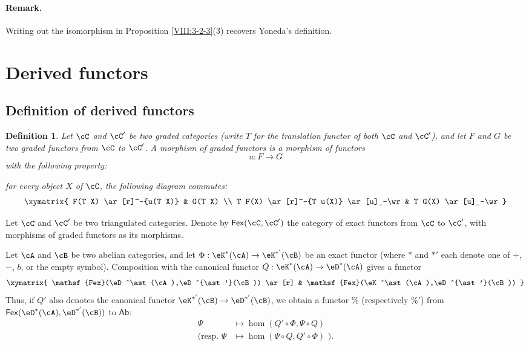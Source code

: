 \documentclass[12pt,oneside,english]{smfbook}
\newtheorem{definition}[subsubsection]{Definition}
\begin{document}
\paragraph{Remark.}
Writing out the isomorphism in Proposition \ref{VIII:3-2-3}(3) recovers Yoneda's definition.

\section{Derived functors}\label{VIII:4}

\subsection{Definition of derived functors}\label{VIII:4-1}

\begin{definition}\label{VIII:4-1-1}
Let $\cC$ and $\cC'$ be two graded categories (write $T$ for the translation functor of both $\cC$ and $\cC'$), and let $F$ and $G$ be two graded functors from $\cC$ to $\cC'$. A \emph{morphism of graded functors} is a morphism of functors
\[
  u:F\to G
\]
with the following property:

for every object $X$ of $\cC$, the following diagram commutes:
\[\xymatrix{
  F(T X) \ar[r]^-{u(T X)}
    & G(T X) \\
  T F(X) \ar[r]^-{T u(X)} \ar[u]_-\wr
    & T G(X) \ar[u]_-\wr
}\]
\end{definition}

Let $\cC$ and $\cC'$ be two triangulated categories. Denote by $\mathsf{Fex}(\cC,\cC')$ the category of exact functors from $\cC$ to $\cC'$, with morphisms of graded functors as its morphisms.

Let $\cA$ and $\cB$ be two abelian categories, and let $\Phi:\eK^\ast(\cA)\to\eK^{\ast'}(\cB)$ be an exact functor (where $\ast$ and $\ast'$ each denote one of $+$, $-$, $b$, or the empty symbol). Composition with the canonical functor $Q:\eK^\ast(\cA)\to\eD^\ast(\cA)$ gives a functor
\[\xymatrix{
  \mathsf{Fex}(\eD^\ast(\cA),\eD^{\ast'}(\cB)) \ar[r]
    & \mathsf{Fex}(\eK^\ast(\cA),\eD^{\ast'}(\cB))
}\]
Thus, if $Q'$ also denotes the canonical functor $\eK^{\ast'}(\cB)\to\eD^{\ast'}(\cB)$, we obtain a functor $\%$ (respectively $\%'$) from $\mathsf{Fex}(\eD^\ast(\cA),\eD^{\ast'}(\cB))$ to $\mathsf{Ab}$:
\begin{align*}
  \Psi  &\mapsto \hom(Q'\circ \Phi,\Psi\circ Q) \\
  (\text{resp. }\Psi &\mapsto \hom(\Psi\circ Q,Q'\circ \Phi)\text{ ).}
\end{align*}
\end{document}
